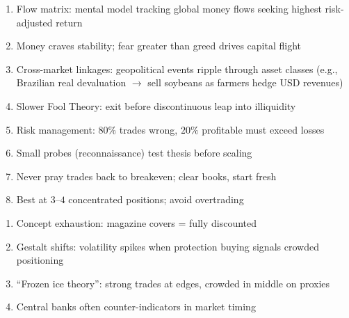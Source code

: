 \documentclass[a4paper,oneside,openany]{book}
\begin{document}
\begin{remark} 
\begin{enumerate}[label=\roman*.]
\setlength{\itemsep}{0pt}
\item Flow matrix: mental model tracking global money flows seeking highest risk-adjusted return
\item Money craves stability; fear greater than greed drives capital flight
\item Cross-market linkages: geopolitical events ripple through asset classes (e.g., Brazilian real devaluation $\rightarrow$ sell soybeans as farmers hedge USD revenues)
\item Slower Fool Theory: exit before discontinuous leap into illiquidity
\item Risk management: $80\%$ trades wrong, $20\%$ profitable must exceed losses
\item Small probes (reconnaissance) test thesis before scaling
\item Never pray trades back to breakeven; clear books, start fresh
\item Best at $3$--$4$ concentrated positions; avoid overtrading
\end{enumerate}
\end{remark}

\begin{remark} 
\begin{enumerate}[label=\roman*.]
\setlength{\itemsep}{0pt}
\item Concept exhaustion: magazine covers = fully discounted
\item Gestalt shifts: volatility spikes when protection buying signals crowded positioning
\item ``Frozen ice theory'': strong trades at edges, crowded in middle on proxies
\item Central banks often counter-indicators in market timing
\end{enumerate}
\end{remark}
\end{document}
